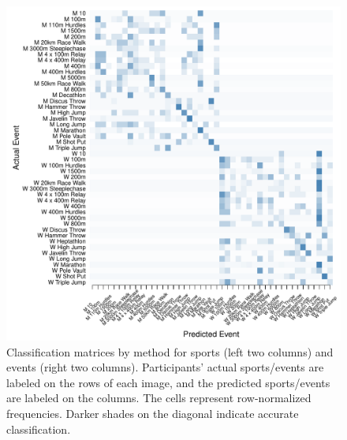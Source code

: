 \begin{figure}
\begin{center}
\begin{minipage}{0.20\textwidth}
\begin{center}
    \end{center}
  \end{minipage}
  \hspace{0.05\textwidth}
  \begin{minipage}{0.20\textwidth}
    \begin{center}
      \includegraphics[scale=0.20]{../graphics/athletesANN-tst.pdf}
    \end{center}
  \end{minipage}

  \end{center}

\caption{Classification matrices by method for sports (left two columns) and events (right two columns). Participants' actual sports/events are labeled on the rows of each image, and the predicted sports/events are labeled on the columns. The cells represent row-normalized frequencies. Darker shades on the diagonal indicate accurate classification.}
\end{figure}